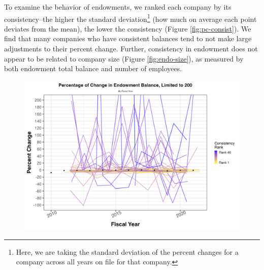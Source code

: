 \documentclass[Dance Data
Project,article,submit,moreauthors,pdftex]{mdpi}
\begin{document}
To examine the behavior of endowments, we ranked each company by its
consistency--the higher the standard deviation\footnote{Here, we are
  taking the standard deviation of the percent changes for a company
  across all years on file for that company.} (how much on average each
point deviates from the mean), the lower the consistency (Figure
\ref{fig:pc-consist}). We find that many companies who have consistent
balances tend to not make large adjustments to their percent change.
Further, consistency in endowment does not appear to be related to
company size (Figure \ref{fig:endo-size}), as measured by both endowment
total balance and number of employees.

\begin{figure}[H]
\includegraphics[width=0.9\linewidth,]{../images/pc_consist} \caption{\label{fig:pc-consist}}\label{fig:unnamed-chunk-8}
\end{figure}
\end{document}

